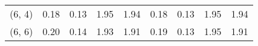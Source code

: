 \begin{tabular}{lrrrrrrrr}
(6, 4)        &                                               0.18 &                                            0.13 &                            1.95 &                                  1.94 &                                               0.18 &                                            0.13 &                            1.95 &                                  1.94 \\
(6, 6)        &                                               0.20 &                                            0.14 &                            1.93 &                                  1.91 &                                               0.19 &                                            0.13 &                            1.95 &                                  1.91 \\
\bottomrule
\end{tabular}
